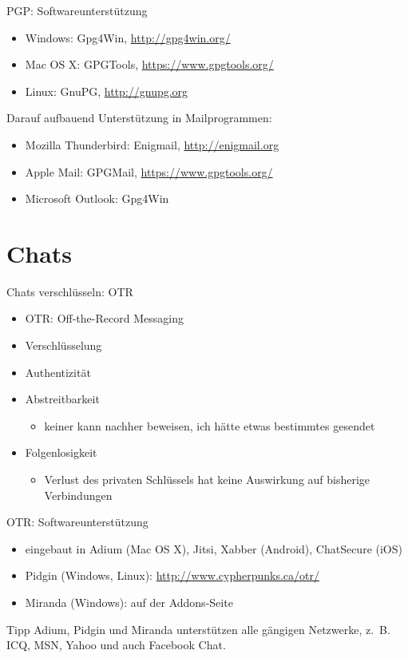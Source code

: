 \documentclass{beamer}
\begin{document}
\begin{frame}{PGP: Softwareunterstützung}
\begin{itemize}
	\item Windows: Gpg4Win, \url{http://gpg4win.org/}
	\item Mac OS X: GPGTools, \url{https://www.gpgtools.org/}
	\item Linux: GnuPG, \url{http://gnupg.org}
\end{itemize}

Darauf aufbauend Unterstützung in Mailprogrammen:
\begin{itemize}
	\item Mozilla Thunderbird: Enigmail, \url{http://enigmail.org}
	\item Apple Mail: GPGMail, \url{https://www.gpgtools.org/}
	\item Microsoft Outlook: Gpg4Win
\end{itemize}
\end{frame}

\section{Chats}
\begin{frame}{Chats verschlüsseln: OTR}
\begin{itemize}
	\item OTR: Off-the-Record Messaging
	\item Verschlüsselung
	\item Authentizität
	\item Abstreitbarkeit
		\begin{itemize}
			\item keiner kann nachher beweisen, ich hätte etwas bestimmtes gesendet
		\end{itemize}
	\item Folgenlosigkeit
		\begin{itemize}
			\item Verlust des privaten Schlüssels hat keine Auswirkung auf bisherige
				Verbindungen
		\end{itemize}
\end{itemize}
\end{frame}

\begin{frame}{OTR: Softwareunterstützung}
\begin{itemize}
	\item eingebaut in Adium (Mac OS X), Jitsi, Xabber (Android), ChatSecure (iOS)
	\item Pidgin (Windows, Linux): \url{http://www.cypherpunks.ca/otr/}
	\item Miranda (Windows): auf der Addons-Seite
\end{itemize}

\begin{block}{Tipp}
	Adium, Pidgin und Miranda unterstützen alle gängigen Netzwerke, z.~B. ICQ,
	MSN, Yahoo und auch Facebook Chat.
\end{block}
\end{frame}
\end{document}
